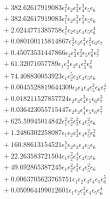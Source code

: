 \documentclass[10pt]{article}
\begin{document}
\begin{align*}
&{}  + 382.62617919083 \epsilon_{1}^{2} \epsilon_{2} \epsilon_{3}^{2} \epsilon_{4}^{3} \epsilon_{5} \epsilon_{6} \\
&{}  + 382.62617919083 \epsilon_{1}^{2} \epsilon_{2} \epsilon_{3}^{3} \epsilon_{4}^{2} \epsilon_{5} \epsilon_{6} \\
&{}  + 2.0244771385758 \epsilon_{1}^{2} \epsilon_{2} \epsilon_{3} \epsilon_{4} \epsilon_{5} \epsilon_{6}^{4} \\
&{}  + 0.080100115814867 \epsilon_{2}^{3} \epsilon_{3} \epsilon_{4}^{2} \epsilon_{5}^{2} \epsilon_{6} \epsilon_{7} \\
&{}  + 0.45073531447866 \epsilon_{2} \epsilon_{3}^{2} \epsilon_{4}^{2} \epsilon_{5} \epsilon_{6}^{2} \epsilon_{7}^{2} \\
&{}  + 61.32071057789 \epsilon_{1} \epsilon_{2}^{3} \epsilon_{3} \epsilon_{4} \epsilon_{5}^{2} \epsilon_{6}^{2} \\
&{}  + 74.408830053923 \epsilon_{1} \epsilon_{2}^{5} \epsilon_{3} \epsilon_{4} \epsilon_{5} \epsilon_{6} \\
&{}  + 0.0045528819644309 \epsilon_{2} \epsilon_{3} \epsilon_{4} \epsilon_{5}^{2} \epsilon_{6} \epsilon_{7}^{4} \\
&{}  + 0.018211527857724 \epsilon_{2} \epsilon_{3} \epsilon_{4}^{3} \epsilon_{5} \epsilon_{6} \epsilon_{7}^{3} \\
&{}  + 0.036423055715447 \epsilon_{2} \epsilon_{3} \epsilon_{4}^{4} \epsilon_{5} \epsilon_{6} \epsilon_{7}^{2} \\
&{}  + 625.59945014842 \epsilon_{1}^{2} \epsilon_{2}^{2} \epsilon_{3}^{2} \epsilon_{4} \epsilon_{5}^{2} \epsilon_{6} \\
&{}  + 1.2486302258087 \epsilon_{1} \epsilon_{2} \epsilon_{3}^{3} \epsilon_{4} \epsilon_{5}^{2} \epsilon_{6}^{2} \\
&{}  + 160.88613154521 \epsilon_{1}^{5} \epsilon_{2} \epsilon_{3} \epsilon_{4} \epsilon_{5} \epsilon_{6} \\
&{}  + 22.263583721504 \epsilon_{1} \epsilon_{2}^{2} \epsilon_{3}^{4} \epsilon_{4} \epsilon_{5} \epsilon_{6} \\
&{}  + 49.692865387245 \epsilon_{1} \epsilon_{2}^{2} \epsilon_{3}^{3} \epsilon_{4} \epsilon_{5}^{2} \epsilon_{6} \\
&{}  + 0.0063705623765751 \epsilon_{1} \epsilon_{2} \epsilon_{3} \epsilon_{4} \epsilon_{5} \epsilon_{6}^{5} \\
&{}  + 0.050964499012601 \epsilon_{1} \epsilon_{2} \epsilon_{3}^{2} \epsilon_{4} \epsilon_{5} \epsilon_{6}^{4} \\

\end{align*}
\end{document}
